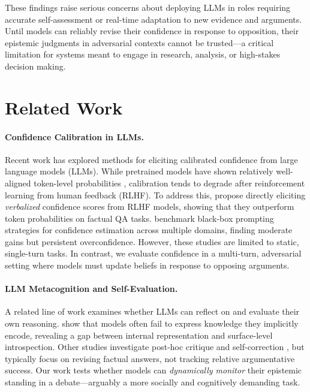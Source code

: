 \documentclass{article}
\begin{document}
These findings raise serious concerns about deploying LLMs in roles requiring accurate self-assessment or real-time adaptation to new evidence and arguments. Until models can reliably revise their confidence in response to opposition, their epistemic judgments in adversarial contexts cannot be trusted—a critical limitation for systems meant to engage in research, analysis, or high-stakes decision making.

\section{Related Work}

\paragraph{Confidence Calibration in LLMs.}
Recent work has explored methods for eliciting calibrated confidence from large language models (LLMs). While pretrained models have shown relatively well-aligned token-level probabilities \citep{kadavath2022know}, calibration tends to degrade after reinforcement learning from human feedback (RLHF). To address this, \citet{tian2023justask} propose directly eliciting \textit{verbalized} confidence scores from RLHF models, showing that they outperform token probabilities on factual QA tasks. \citet{xiong2024uncertainty} benchmark black-box prompting strategies for confidence estimation across multiple domains, finding moderate gains but persistent overconfidence. However, these studies are limited to static, single-turn tasks. In contrast, we evaluate confidence in a multi-turn, adversarial setting where models must update beliefs in response to opposing arguments.

\paragraph{LLM Metacognition and Self-Evaluation.}
A related line of work examines whether LLMs can reflect on and evaluate their own reasoning. \citet{song2025introspect} show that models often fail to express knowledge they implicitly encode, revealing a gap between internal representation and surface-level introspection. Other studies investigate post-hoc critique and self-correction \cite{Li2024ConfidenceMR}, but typically focus on revising factual answers, not tracking relative argumentative success. Our work tests whether models can \textit{dynamically monitor} their epistemic standing in a debate—arguably a more socially and cognitively demanding task.
\end{document}
